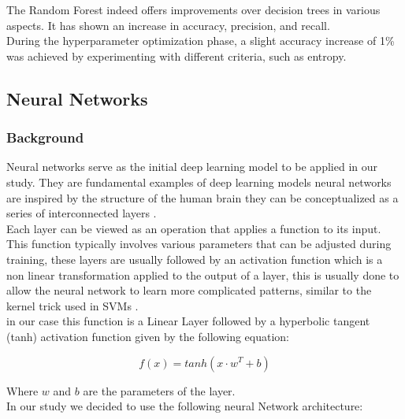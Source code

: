 \documentclass{article}
\begin{document}
The Random Forest indeed offers improvements over decision trees in various aspects. It has shown an increase in accuracy, precision, and recall.\\

During the hyperparameter optimization phase, a slight accuracy increase of 1\% was achieved by experimenting with different criteria, such as entropy.

\subsection{Neural Networks}
\subsubsection{Background}

Neural networks serve as the initial deep learning model to be applied in our study. They are fundamental examples of deep learning models neural networks are inspired by the structure of the human brain they can be conceptualized as a series of interconnected layers \cite{Goodfellow2016}.\\ 

Each layer can be viewed as an operation that applies a function to its input. This function typically involves various parameters that can be adjusted during training, these layers are usually followed by an activation function which is a non linear transformation applied to the output of a layer, this is usually done to allow the neural network to learn more complicated patterns, similar to the kernel trick used in SVMs \cite{Goodfellow2016}. \\

in our case this function is a Linear Layer followed by a hyperbolic tangent (tanh) activation function given by the following equation:

\begin{equation}
    f(x) = tanh(x \cdot w^T + b)
\end{equation}

Where $w$ and $b$ are the parameters of the layer. \\

In our study we decided to use the following neural Network architecture:\\
\end{document}
